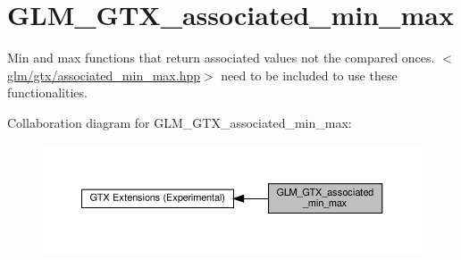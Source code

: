 \hypertarget{group__gtx__associated__min__max}{}\section{G\+L\+M\+\_\+\+G\+T\+X\+\_\+associated\+\_\+min\+\_\+max}
\label{group__gtx__associated__min__max}


Min and max functions that return associated values not the compared onces. $<$\hyperlink{associated__min__max_8hpp}{glm/gtx/associated\+\_\+min\+\_\+max.\+hpp}$>$ need to be included to use these functionalities.  


Collaboration diagram for G\+L\+M\+\_\+\+G\+T\+X\+\_\+associated\+\_\+min\+\_\+max\+:\nopagebreak
\begin{figure}[H]
\begin{center}
\leavevmode
\includegraphics[width=350pt]{group__gtx__associated__min__max}
\end{center}
\end{figure}
